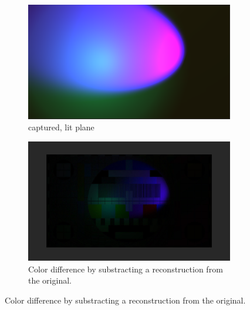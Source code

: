 \begin{figure}[htbp]
	\caption{A comparison of different composition methods in engine}
	\label{fig:light-reconstruction:diff-capture}
	\begin{subfigure}[t]{.45\textwidth}
		\centering
		\includegraphics[width=\textwidth]{_raw_resources/light-reconstruction/capture.png}
		\caption{captured, lit plane}
	\end{subfigure}
	\begin{subfigure}[t]{.45\textwidth}
		\centering
		\includegraphics[width=\textwidth]{_raw_resources/light-reconstruction/color_difference.png}
		\caption{Color difference by substracting a reconstruction from the 
			original.}
	\end{subfigure}
\end{figure}

